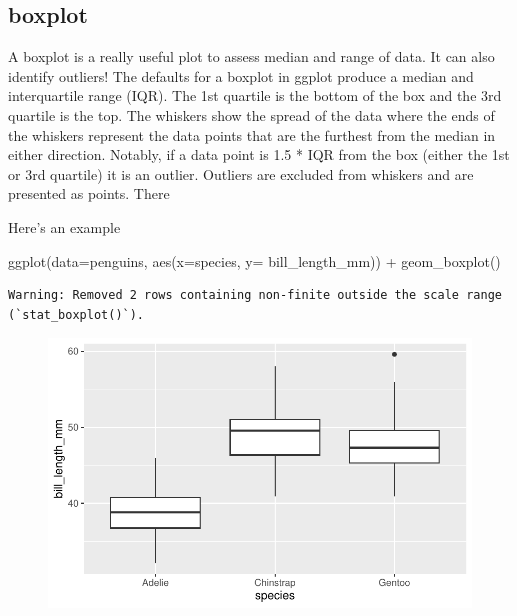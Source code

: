 \documentclass[
  letterpaper,
  DIV=11,
  numbers=noendperiod]{scrartcl}
\newenvironment{Shaded}{\begin{snugshade}}{\end{snugshade}}
\newcommand{\AttributeTok}[1]{\textcolor[rgb]{0.40,0.45,0.13}{#1}}
\newcommand{\FunctionTok}[1]{\textcolor[rgb]{0.28,0.35,0.67}{#1}}
\newcommand{\NormalTok}[1]{\textcolor[rgb]{0.00,0.23,0.31}{#1}}
\newcommand{\SpecialCharTok}[1]{\textcolor[rgb]{0.37,0.37,0.37}{#1}}
\begin{document}
\subsection{\texorpdfstring{\textbf{boxplot}}{boxplot}}

A boxplot is a really useful plot to assess median and range of data. It
can also identify outliers! The defaults for a boxplot in ggplot produce
a median and interquartile range (IQR). The 1st quartile is the bottom
of the box and the 3rd quartile is the top. The whiskers show the spread
of the data where the ends of the whiskers represent the data points
that are the furthest from the median in either direction. Notably, if a
data point is 1.5 * IQR from the box (either the 1st or 3rd quartile) it
is an outlier. Outliers are excluded from whiskers and are presented as
points. There

Here's an example

\begin{Shaded}
\begin{Highlighting}[]
\FunctionTok{ggplot}\NormalTok{(}\AttributeTok{data=}\NormalTok{penguins, }\FunctionTok{aes}\NormalTok{(}\AttributeTok{x=}\NormalTok{species, }\AttributeTok{y=}\NormalTok{ bill\_length\_mm)) }\SpecialCharTok{+}
  \FunctionTok{geom\_boxplot}\NormalTok{()}
\end{Highlighting}
\end{Shaded}

\begin{verbatim}
Warning: Removed 2 rows containing non-finite outside the scale range
(`stat_boxplot()`).
\end{verbatim}

\begin{figure}[H]

{\centering \includegraphics{Lab_2_files/figure-pdf/unnamed-chunk-8-1.pdf}

}

\end{figure}
\end{document}
